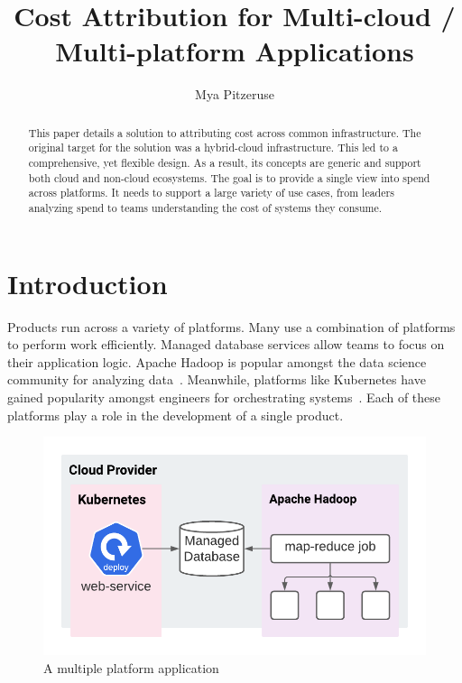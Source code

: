 \documentclass[10pt, a4paper, twocolumn]{article}
\title{Cost Attribution for Multi-cloud / Multi-platform Applications}
\author{Mya Pitzeruse}
\begin{document}
\maketitle

\begin{abstract}
  This paper details a solution to attributing cost across common infrastructure.
  The original target for the solution was a hybrid-cloud infrastructure.
  This led to a comprehensive, yet flexible design.
  As a result, its concepts are generic and support both cloud and non-cloud ecosystems.
  The goal is to provide a single view into spend across platforms.
  It needs to support a large variety of use cases, from leaders analyzing spend to teams understanding the cost of systems they consume.
\end{abstract}


\section*{Introduction}
  Products run across a variety of platforms.
  Many use a combination of platforms to perform work efficiently.
  Managed database services allow teams to focus on their application logic.
  Apache Hadoop is popular amongst the data science community for analyzing data~\cite{hadoop}.
  Meanwhile, platforms like Kubernetes have gained popularity amongst engineers for orchestrating systems~\cite{k8s}.
  Each of these platforms play a role in the development of a single product.

  \begin{figure}[H]
    \centering
    \includegraphics[width=\linewidth]{./cost-attribution-application.png}
    \caption{A multiple platform application}
    \label{figure:1}
  \end{figure}
\end{document}
